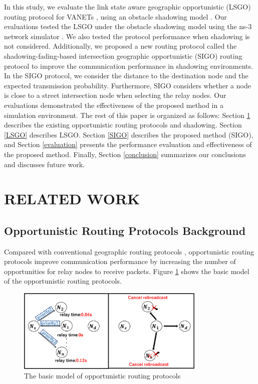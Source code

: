 \documentclass[conference]{IEEEtran}
\begin{document}
In this study, we evaluate the link state aware geographic opportunistic (LSGO)
routing protocol for VANETs \cite{18}, using an obstacle shadowing model \cite{20}. 
Our evaluations tested the LSGO under the obstacle shadowing model \cite{20} using the ns-3 network simulator \cite{19}. 
We also tested the protocol performance when shadowing is not considered.
Additionally, we proposed a new routing protocol called the shadowing-fading-based intersection geographic opportunistic (SIGO) routing protocol to improve the communication performance in shadowing environments.
In the SIGO protocol, we consider the distance to the destination node and the expected transmission probability. Furthermore, SIGO considers whether a node is close to a street intersection node  when selecting the relay nodes.
Our evaluations demonstrated the effectiveness of the proposed method in a simulation environment. 
The rest of this paper is organized as follows:
Section \ref{relatedSection} describes the existing opportunistic routing protocols and shadowing. 
Section \ref{LSGO} describes LSGO. 
Section \ref{SIGO} describes the proposed method (SIGO), and Section \ref{evaluation} presents the performance evaluation and effectiveness of the proposed method. Finally, Section \ref{conclusion} summarizes our conclusions and discusses future work.





\section{RELATED WORK}
\label{relatedSection}

\subsection{Opportunistic Routing Protocols Background}

Compared with conventional geographic routing protocols \cite{6}, opportunistic routing protocols improve communication performance by increasing the number of opportunities for relay nodes to receive packets. Figure \ref{fig:Basic} shows the basic model of the opportunistic routing protocols.

\begin{figure}[!ht]
\centering
\includegraphics[width=90mm]{figures/basic-opportunity2.eps}
\caption{The basic model of opportunistic routing protocols}
\label{fig:Basic}
\end{figure}
\end{document}
